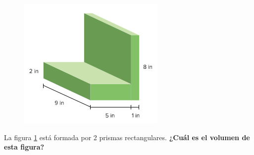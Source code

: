 \begin{multicols}{2}
    \begin{figure}[H]
        \centering
        \caption{}
        \label{fig:20230316201422}
        \includegraphics[width=0.55\linewidth]{../images/20230316201422}
    \end{figure}
    \columnbreak
    La figura \ref{fig:20230316201422} está formada por 2 prismas rectangulares.
    \textbf{¿Cuál es el volumen de esta figura?}
\end{multicols}
